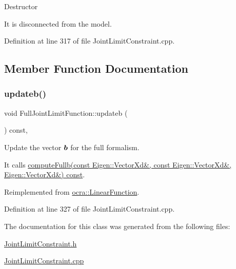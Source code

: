 Destructor

It is disconnected from the model. 

Definition at line 317 of file Joint\+Limit\+Constraint.\+cpp.



\subsection{Member Function Documentation}
\hypertarget{classocra_1_1FullJointLimitFunction_a3c9bcab2026535cc5f2c0176552d449d}{}\label{classocra_1_1FullJointLimitFunction_a3c9bcab2026535cc5f2c0176552d449d} 
\subsubsection{\texorpdfstring{updateb()}{updateb()}}
{\footnotesize\ttfamily void Full\+Joint\+Limit\+Function\+::updateb (\begin{DoxyParamCaption}{ }\end{DoxyParamCaption}) const\hspace{0.3cm}{\ttfamily [protected]}, {\ttfamily [virtual]}}

Update the vector $ \mbox{\boldmath${b}$} $ for the full formalism.

It calls \hyperlink{classocra_1_1JointLimitFunction_a254ef5b5095410a802976c95f04fe0a4}{compute\+Fullb(const Eigen\+::\+Vector\+Xd\&, const Eigen\+::\+Vector\+Xd\&, Eigen\+::\+Vector\+Xd\&) const}. 

Reimplemented from \hyperlink{classocra_1_1LinearFunction_a546454cd8d0909f99433ffc0e700c9e3}{ocra\+::\+Linear\+Function}.



Definition at line 327 of file Joint\+Limit\+Constraint.\+cpp.



The documentation for this class was generated from the following files\+:\begin{DoxyCompactItemize}
\item 
\hyperlink{JointLimitConstraint_8h}{Joint\+Limit\+Constraint.\+h}\item 
\hyperlink{JointLimitConstraint_8cpp}{Joint\+Limit\+Constraint.\+cpp}\end{DoxyCompactItemize}
